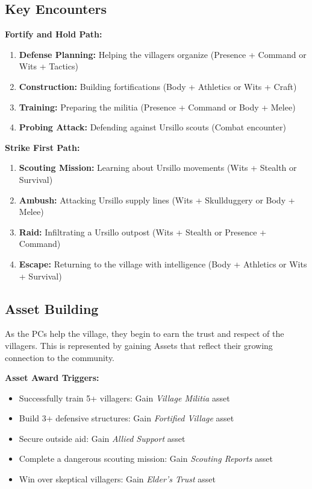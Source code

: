 \documentclass[11pt]{article}
\begin{document}
\subsection{Key Encounters}

\textbf{Fortify and Hold Path:}
\begin{enumerate}
\item \textbf{Defense Planning:} Helping the villagers organize (Presence + Command or Wits + Tactics)
\item \textbf{Construction:} Building fortifications (Body + Athletics or Wits + Craft)
\item \textbf{Training:} Preparing the militia (Presence + Command or Body + Melee)
\item \textbf{Probing Attack:} Defending against Ursillo scouts (Combat encounter)
\end{enumerate}

\textbf{Strike First Path:}
\begin{enumerate}
\item \textbf{Scouting Mission:} Learning about Ursillo movements (Wits + Stealth or Survival)
\item \textbf{Ambush:} Attacking Ursillo supply lines (Wits + Skullduggery or Body + Melee)
\item \textbf{Raid:} Infiltrating a Ursillo outpost (Wits + Stealth or Presence + Command)
\item \textbf{Escape:} Returning to the village with intelligence (Body + Athletics or Wits + Survival)
\end{enumerate}

\subsection{Asset Building}

As the PCs help the village, they begin to earn the trust and respect of the villagers. This is represented by gaining Assets that reflect their growing connection to the community.

\textbf{Asset Award Triggers:}
\begin{itemize}
\item Successfully train 5+ villagers: Gain \textit{Village Militia} asset
\item Build 3+ defensive structures: Gain \textit{Fortified Village} asset  
\item Secure outside aid: Gain \textit{Allied Support} asset
\item Complete a dangerous scouting mission: Gain \textit{Scouting Reports} asset
\item Win over skeptical villagers: Gain \textit{Elder's Trust} asset
\end{itemize}
\end{document}
